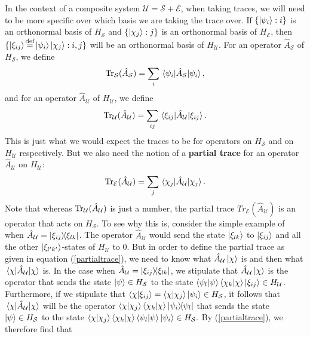     In the context of a composite system $\mathcal{U}=\mathcal{S}+\mathcal{E}$, 
    when taking traces, we will need to be more specific over which basis we are taking the trace over. 
     If $\{\ket{\psi_i}:i\}$ is an orthonormal basis of $H_\mathcal{S}$ and $\{\ket{\chi_j}:j\}$ 
     is an orthonormal basis of $H_\mathcal{E}$, 
     then $\{\ket{\xi_{ij}}\myeq\ket{\psi_i}\ket{\chi_j}:i,j\}$ 
     will be an orthonormal basis of $H_\mathcal{U}$. 
     For an operator $\hat{A}_\mathcal{S}$ of $H_\mathcal{S}$, we define 
    $$\Tr_\mathcal{S}(\hat{A}_\mathcal{S})=\sum_i \ev*{\hat{A}_\mathcal{S}}{\psi_i},$$
     and for an operator $\hat{A}_\mathcal{U}$ of $H_\mathcal{U}$, we define 
     $$\Tr_\mathcal{U}(\hat{A}_\mathcal{U})=\sum_{ij} \ev*{\hat{A}_\mathcal{U}}{\xi_{ij}}.$$
    This  %
% 
    is just what we would expect the traces to be for operators on $H_\mathcal{S}$ and on $H_\mathcal{U}$ respectively. But we also need the notion of a \textbf{partial trace} for an operator $\hat{A}_\mathcal{U}$ on $H_\mathcal{U}$: 
    \begin{equation}\label{partialtrace} \Tr_\mathcal{E}(\hat{A}_\mathcal{U})=\sum_j \ev*{\hat{A}_\mathcal{U}}{\chi_j}.\end{equation} 
    Note  %
% 
    that whereas $\operatorname{Tr}_\mathcal{U}(\hat{A}_\mathcal{U})$ is just a number, the partial trace $Tr_\mathcal{E}(\hat{A}_\mathcal{U})$  is an operator that acts on $H_\mathcal{S}$. To see why this is, consider the simple example of when $\hat{A}_\mathcal{U}=\dyad{\xi_{ij}}{\xi_{lk}}$. The operator $\hat{A}_\mathcal{U}$ would send the state $\ket{\xi_{lk}}$ to $\ket{\xi_{ij}}$ and all the other $\ket{\xi_{l'k'}}$-states of $H_\mathcal{U}$ to $0$. But in order to define the partial trace as given in equation (\ref{partialtrace}), we need to know what $\hat{A}_\mathcal{U}\ket{\chi}$ is and then what $\ev*{\hat{A}_\mathcal{U}}{\chi}$ is. In the case when $\hat{A}_\mathcal{U}=\dyad{\xi_{ij}}{\xi_{lk}}$, we stipulate that $\hat{A}_\mathcal{U}\ket{\chi}$ is the operator that sends the state $\ket{\psi}\in H_\mathcal{S}$ to the state $\ip{\psi_l}{\psi}\ip{\chi_k}{\chi}\ket{\xi_{ij}}\in H_\mathcal{U}$.  Furthermore, if we stipulate that $\ip{\chi}{\xi_{ij}}=\ip{\chi}{\chi_j}\ket{\psi_i}\in H_\mathcal{S}$, it follows that $\ev*{\hat{A}_\mathcal{U}}{\chi}$ will be the operator $\ip{\chi}{\chi_j}\ip{\chi_k}{\chi}\dyad{\psi_i}{\psi_l}$ that sends  the state $\ket{\psi}\in H_\mathcal{S}$ to the state  $\ip{\chi}{\chi_j}\ip{\chi_k}{\chi}\ip{\psi_l}{\psi}\ket{\psi_i}\in H_\mathcal{S}.$ By (\ref{partialtrace}), we therefore find that
